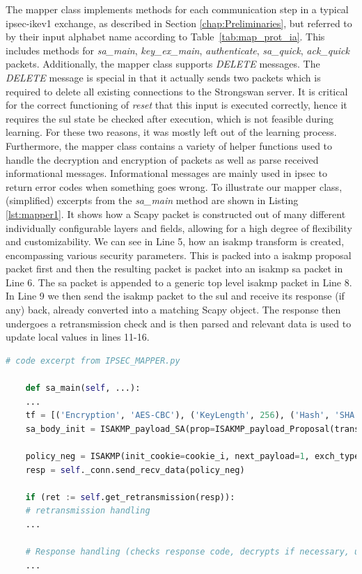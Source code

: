 The mapper class implements methods for each communication step in a typical \ac{ipsec}-\ac{ike}v1 exchange, as described in Section \ref{chap:Preliminaries}, but referred to by their input alphabet name according to Table~\ref{tab:map_prot_ia}. This includes methods for \emph{sa\_main}, \emph{key\_ex\_main}, \emph{authenticate}, \emph{sa\_quick}, \emph{ack\_quick} packets. Additionally, the mapper class supports \emph{DELETE} messages. The \emph{DELETE} message is special in that it actually sends two packets which is required to delete all existing connections to the Strongswan server. It is critical for the correct functioning of \emph{reset} that this input is executed correctly, hence it requires the \ac{sul} state be checked after execution, which is not feasible during learning. For these two reasons, it was mostly left out of the learning process. Furthermore, the mapper class contains a variety of helper functions used to handle the decryption and encryption of packets as well as parse received informational messages. Informational messages are mainly used in \ac{ipsec} to return error codes when something goes wrong. To illustrate our mapper class, (simplified) excerpts from the \emph{sa\_main} method are shown in Listing \ref{lst:mapper1}. It shows how a Scapy packet is constructed out of many different individually configurable layers and fields, allowing for a high degree of flexibility and customizability. We can see in Line 5, how an \ac{isakmp} transform is created, encompassing various security parameters. This is packed into a \ac{isakmp} proposal packet first and then the resulting packet is packet into an \ac{isakmp} \ac{sa} packet in Line 6. The \ac{sa} packet is appended to a generic top level \ac{isakmp} packet in Line 8. In Line 9 we then send the \ac{isakmp} packet to the \ac{sul} and receive its response (if any) back, already converted into a matching Scapy object. The response then undergoes a retransmission check and is then parsed and relevant data is used to update local values in lines 11-16.

\begin{lstlisting}[float=h, caption=Excerpt of sa\_main method code, label=lst:mapper1, language=python]
	# code excerpt from IPSEC_MAPPER.py
	
	def sa_main(self, ...):
	...
	tf = [('Encryption', 'AES-CBC'), ('KeyLength', 256), ('Hash', 'SHA'), ('GroupDesc', '1024MODPgr'), ('Authentication', 'PSK'), ('LifeDuration', 28800)]
	sa_body_init = ISAKMP_payload_SA(prop=ISAKMP_payload_Proposal(trans_nb=1, trans=ISAKMP_payload_Transform(num=1, transforms=tf)))
	
	policy_neg = ISAKMP(init_cookie=cookie_i, next_payload=1, exch_type=2)/sa_body_init
	resp = self._conn.send_recv_data(policy_neg)
	
	if (ret := self.get_retransmission(resp)): 
	# retransmission handling
	...
	
	# Response handling (checks response code, decrypts if necessary, updates relevant local values)
	...
\end{lstlisting}

